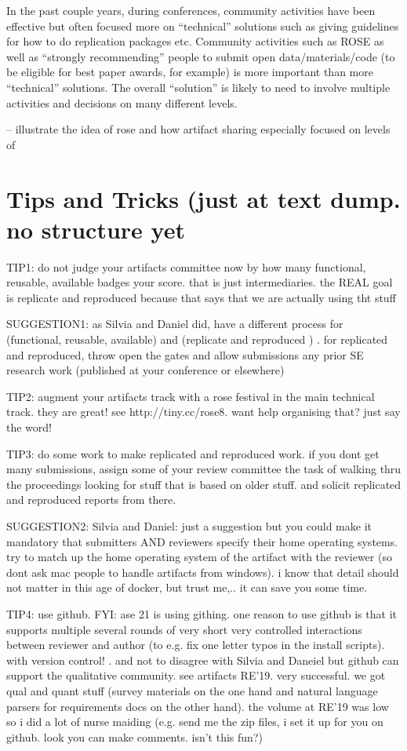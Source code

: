 \documentclass[smallextended]{svjour3}       %
\begin{document}
In the past couple years, during conferences, community activities have been effective but often focused more on “technical” solutions such as giving guidelines for how to do replication packages etc. Community activities such as ROSE as well as “strongly recommending” people to submit open data/materials/code (to be eligible for best paper awards, for example) is more important than more “technical” solutions. The overall “solution” is likely to need to involve multiple activities and decisions on many different levels. 

-- illustrate the idea of rose and how artifact sharing especially focused on levels of 


\section{Tips and Tricks (just at text dump. no structure yet}


TIP1: do not  judge your artifacts committee now by how many functional, reusable, available badges your score. that is just intermediaries. the REAL  goal is replicate and reproduced because that says that we are actually using tht stuff

SUGGESTION1:  as Silvia and Daniel did, have a different process for (functional, reusable, available) and (replicate and reproduced ) . for replicated and reproduced, throw open the gates and allow submissions  any prior SE research work (published at your conference  or elsewhere)  

TIP2: augment your artifacts track with a rose festival in the main technical track. they are great! see http://tiny.cc/rose8. want help organising that? just say the word! 

TIP3: do some work to make replicated and reproduced work. if you dont get many submissions, assign some of your review committee the task of walking thru the proceedings looking for stuff that is based on older stuff. and solicit replicated and reproduced reports from there. 

SUGGESTION2:  Silvia and Daniel: just a suggestion but you could make it mandatory that  submitters AND reviewers specify their home operating systems.  try to match up the home operating system of the artifact with the reviewer (so dont ask mac people to handle artifacts from windows). i know that detail should not matter in this age of docker, but trust me,.. it can save you some time.

TIP4: use github. FYI: ase 21 is using githing. one reason to use github is that it supports multiple  several rounds of very short very controlled interactions between reviewer and author (to e.g. fix one letter typos in the install scripts).  with version control! .  and not to disagree with Silvia and Daneiel but github can support the  qualitative  community. see artifacts RE'19. very successful. we got qual and quant stuff (survey materials on the one hand and natural language parsers for requirements docs on the other hand). the volume at RE'19 was low so i did a lot of nurse maiding (e.g. send me the zip files, i set it up for you on github. look you can make comments. isn't this fun?)
\end{document}
